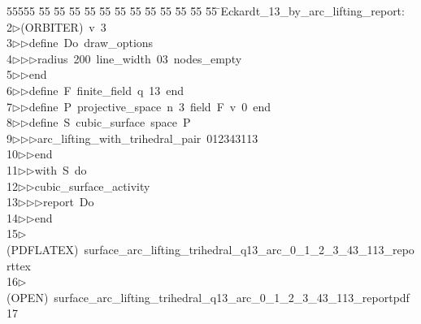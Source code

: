 %
%
\begin{tabbing}
55555 \= 55 \= 55 \= 55 \= 55 \= 55 \= 55 \= 55 \= 55 \= 55 \= 55 \= 55 \= 55 \= \>Eckardt\_13\_by\_arc\_lifting\_report:\\[0pt]
2\>$\triangleright$\>(ORBITER)\ v\ 3\ \\[0pt]
3\>$\triangleright$\>$\triangleright$\>define\ Do\ draw\_options\ \\[0pt]
4\>$\triangleright$\>$\triangleright$\>$\triangleright$\>radius\ 200\ line\_width\ 03\ nodes\_empty\ \\[0pt]
5\>$\triangleright$\>$\triangleright$\>end\ \\[0pt]
6\>$\triangleright$\>$\triangleright$\>define\ F\ finite\_field\ q\ 13\ end\ \\[0pt]
7\>$\triangleright$\>$\triangleright$\>define\ P\ projective\_space\ n\ 3\ field\ F\ v\ 0\ end\ \\[0pt]
8\>$\triangleright$\>$\triangleright$\>define\ S\ cubic\_surface\ space\ P\ \\[0pt]
9\>$\triangleright$\>$\triangleright$\>$\triangleright$\>arc\_lifting\_with\_trihedral\_pair\ 012343113\ \\[0pt]
10\>$\triangleright$\>$\triangleright$\>end\ \\[0pt]
11\>$\triangleright$\>$\triangleright$\>with\ S\ do\ \\[0pt]
12\>$\triangleright$\>$\triangleright$\>cubic\_surface\_activity\ \\[0pt]
13\>$\triangleright$\>$\triangleright$\>$\triangleright$\>report\ Do\ \\[0pt]
14\>$\triangleright$\>$\triangleright$\>end\\[0pt]
15\>$\triangleright$\>(PDFLATEX)\ surface\_arc\_lifting\_trihedral\_q13\_arc\_0\_1\_2\_3\_43\_113\_reporttex\\[0pt]
16\>$\triangleright$\>(OPEN)\ surface\_arc\_lifting\_trihedral\_q13\_arc\_0\_1\_2\_3\_43\_113\_reportpdf\\[0pt]
17\>\end{tabbing}
